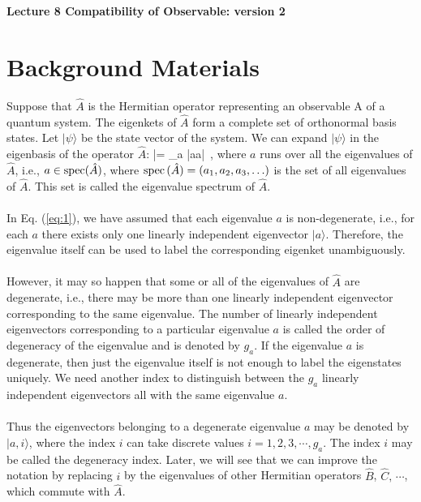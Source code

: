 
\setcounter{chapter}{8}
\noindent
\begin{Large}
{\bf Lecture 8 \newline
Compatibility of Observable: version 2}
\end{Large}

\section{Background Materials}
Suppose that $\hat{A}$ is the Hermitian operator representing an observable A of a quantum system. The eigenkets of ${\hat A}$
form a complete set of orthonormal basis states. Let $|\psi\rangle$ be the state vector of the system. We can expand 
$|\psi\rangle$ in the eigenbasis of the operator ${\hat A}$:
\be
|\psi\rangle = \sum_a |a\rangle \langle a|\psi\rangle \, , 
\label{eq:1}
\ee
where $a$ runs over all the eigenvalues of ${\hat A}$, i.e., $a\in {\rm spec}(\hat{A})$, where ${\rm spec}\,(\hat{A}) =
(a_1,a_2, a_3, \ldots )$ is the set of all eigenvalues of $\hat{A}$. This set is called the eigenvalue spectrum of $\hat{A}$.


\paragraph{}
In Eq. (\ref{eq:1}), we have assumed that each eigenvalue $a$ is non-degenerate, i.e., for each $a$ there exists only one linearly independent eigenvector $|a\rangle$. Therefore, the eigenvalue itself can be used to label the corresponding eigenket unambiguously.

\paragraph{}
However, it may so happen that some or all of the eigenvalues of ${\hat A}$ are degenerate, i.e., there may be more than one linearly independent eigenvector corresponding to the same eigenvalue. The number of linearly independent eigenvectors corresponding
to a particular eigenvalue $a$ is called the order of degeneracy of the eigenvalue and is denoted by $g_a$. If the eigenvalue $a$ is degenerate, then just the eigenvalue itself is not enough to label the eigenstates uniquely. We need another index to distinguish between the $g_a$ linearly independent eigenvectors all with the same eigenvalue $a$.

\paragraph{}
Thus the eigenvectors belonging to a degenerate eigenvalue $a$ may be denoted by $|a,i\rangle$, where the index $i$ 
can take discrete values $i=1,2,3, \cdots , g_a$. The index $i$ may be called the degeneracy index. Later, we will see that we can improve the notation by replacing $i$ by the eigenvalues of other Hermitian operators $\hat{B}$, $\hat{C},\, \cdots$, which commute
with $\hat{A}$. 

